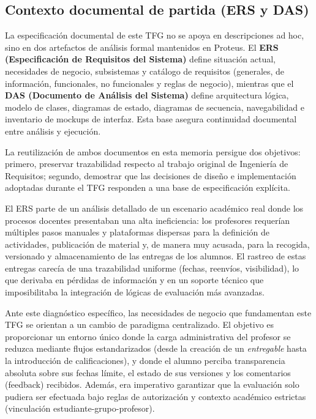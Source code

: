 \subsection{Contexto documental de partida (ERS y DAS)}

La especificaci\'on documental de este TFG no se apoya en descripciones ad hoc, sino en dos artefactos de an\'alisis formal mantenidos en Proteus. El \textbf{ERS (Especificaci\'on de Requisitos del Sistema)} define situaci\'on actual, necesidades de negocio, subsistemas y cat\'alogo de requisitos (generales, de informaci\'on, funcionales, no funcionales y reglas de negocio), mientras que el \textbf{DAS (Documento de An\'alisis del Sistema)} define arquitectura l\'ogica, modelo de clases, diagramas de estado, diagramas de secuencia, navegabilidad e inventario de mockups de interfaz. Esta base asegura continuidad documental entre an\'alisis y ejecuci\'on.

La reutilizaci\'on de ambos documentos en esta memoria persigue dos objetivos:
primero, preservar trazabilidad respecto al trabajo original de Ingenier\'ia
de Requisitos; segundo, demostrar que las decisiones de dise\~no e implementaci\'on
adoptadas durante el TFG responden a una base de especificaci\'on expl\'icita.



El ERS parte de un an\'alisis detallado de un escenario acad\'emico real donde los procesos docentes presentaban una alta ineficiencia: los profesores requer\'ian m\'ultiples pasos manuales y plataformas dispersas para la definici\'on de actividades, publicaci\'on de material y, de manera muy acusada, para la recogida, versionado y almacenamiento de las entregas de los alumnos. El rastreo de estas entregas carec\'ia de una trazabilidad uniforme (fechas, reenv\'ios, visibilidad), lo que derivaba en p\'erdidas de informaci\'on y en un soporte t\'ecnico que imposibilitaba la integraci\'on de l\'ogicas de evaluaci\'on m\'as avanzadas.

Ante este diagn\'ostico espec\'ifico, las necesidades de negocio que fundamentan este TFG se orientan a un cambio de paradigma centralizado. El objetivo es proporcionar un entorno \'unico donde la carga administrativa del profesor se reduzca mediante flujos estandarizados (desde la creaci\'on de un \emph{entregable} hasta la introducci\'on de calificaciones), y donde el alumno perciba transparencia absoluta sobre sus fechas l\'imite, el estado de sus versiones y los comentarios (feedback) recibidos. Adem\'as, era imperativo garantizar que la evaluaci\'on solo pudiera ser efectuada bajo reglas de autorizaci\'on y contexto acad\'emico estrictas (vinculaci\'on estudiante-grupo-profesor). 

